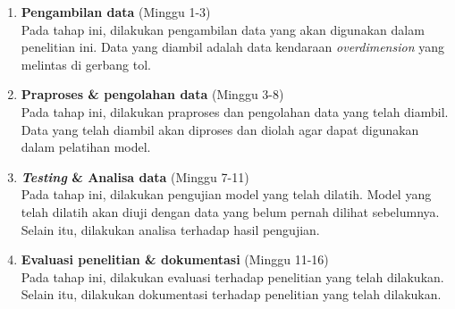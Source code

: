 \begin{enumerate}[label=\textbf{\arabic*.}]
  \item \textbf{Pengambilan data} (Minggu 1-3) \\
        Pada tahap ini, dilakukan pengambilan data yang akan digunakan dalam penelitian ini. Data yang diambil adalah data kendaraan \emph{overdimension} yang melintas di gerbang tol.

  \item \textbf{Praproses \& pengolahan data} (Minggu 3-8) \\
        Pada tahap ini, dilakukan praproses dan pengolahan data yang telah diambil. Data yang telah diambil akan diproses dan diolah agar dapat digunakan dalam pelatihan model.

  \item \textbf{\emph{Testing} \& Analisa data} (Minggu 7-11) \\
        Pada tahap ini, dilakukan pengujian model yang telah dilatih. Model yang telah dilatih akan diuji dengan data yang belum pernah dilihat sebelumnya. Selain itu, dilakukan analisa terhadap hasil pengujian.

  \item \textbf{Evaluasi penelitian \& dokumentasi} (Minggu 11-16) \\
        Pada tahap ini, dilakukan evaluasi terhadap penelitian yang telah dilakukan. Selain itu, dilakukan dokumentasi terhadap penelitian yang telah dilakukan.
\end{enumerate}